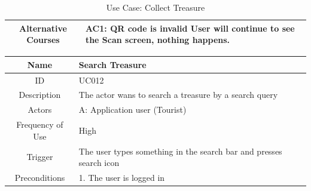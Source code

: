 \documentclass[12pt, a4paper, oneside]{article}
\begin{document}
\begin{table}[H]
\begin{tabularx}{\linewidth}{|c|X|}
Alternative Courses & AC1: QR code is invalid \newline User will continue to see the Scan screen, nothing happens. \newline                                                                                           \\ \hline
\end{tabularx}
\caption{Use Case: Collect Treasure}
\label{uc-collect-treasure}
\end{table}

\begin{table}[H]
\begin{tabularx}{\linewidth}{|c|X|}
\hline
Name                & Search Treasure                                                                                                                                                                                                                     \\ \hline
ID                  & UC012                                                                                                                                                                                                                       \\ \hline
Description         & The actor wans to search a treasure by a search query                                                                                                                                                   \\ \hline
Actors              & A: Application user (Tourist)                                                                                                                                                                                                 \\ \hline
Frequency of Use    & High                                                                                                                                                                                                                    \\ \hline
Trigger             & The user types something in the search bar and presses search icon                                                                                                                                                                                           \\ \hline
Preconditions       & 1. The user is logged in                                                                                                                                                                                                                         \\ \hline

\end{tabularx}
\end{table}
\end{document}
